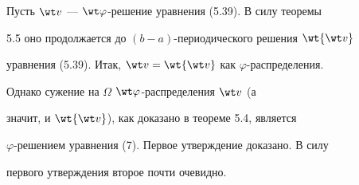  


\begin{pf} 


Пусть $\wt v$ --- $\wt\varphi$-решение уравнения (5.39). В силу теоремы 


5.5 оно продолжается до $(b{-}a)$-периодического решения $\wt{\wt v}$ 


уравнения (5.39). Итак, $\wt v=\wt{\wt v}$ как $\varphi$-распределения. 


Однако сужение на $\Omega$\; $\wt\varphi$-распределения $\wt v$ (а 


значит, и $\wt{\wt v}$), как доказано в теореме 5.4, является 


$\varphi$-решением уравнения (7). Первое утверждение доказано. В силу 


первого утверждения второе почти очевидно. 


\end{pf} 


 


